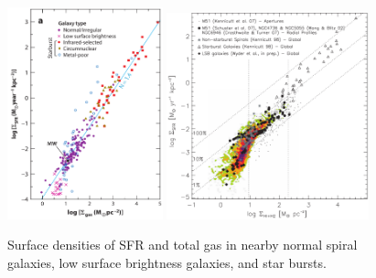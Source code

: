 \documentclass[legal,11pt]{article}
\providecommand{\DIFdelend}{} %
\begin{document}
\DIFdelend %


\begin{figure}
\centering
\includegraphics[width=0.4\textwidth]{KSlaw.pdf}
\includegraphics[width=0.52\textwidth]{bigiel08.pdf}
\caption{Surface densities of SFR and total gas in nearby normal spiral
        galaxies, low surface brightness galaxies, and star
        bursts\citep[i.e.,][]{Bigiel2008}.  }
\label{bigiel08}
\end{figure}
\end{document}
